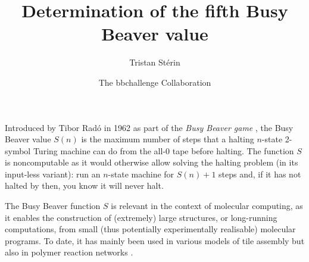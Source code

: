 \documentclass[11pt]{article}
\title{
  \vspace{-1em}  
Determination of the fifth Busy Beaver value\vspace{-0.5em}}
\author[1]{Tristan Stérin}
\author[2]{The bbchallenge Collaboration}
\affil[1]{prgm.dev, Paris, France\\ \href{mailto:tristan@prgm.dev}{tristan@prgm.dev}}
\affil[2]{bbchallenge.org\\ \href{mailto:bbchallenge@bbchallenge.org}{bbchallenge@bbchallenge.org}}
\date{}
\newcommand{\radofull}{Tibor Rad\'o\xspace}
\theoremstyle{definition} %
\numberwithin{equation}{section}
\theoremstyle{definition} %
\begin{document}
\maketitle

\newcommand{\ie}{i.e.\ }
\newcommand{\eg}{e.g.\ }

\newcommand{\noncomput}{noncomputable\xspace}
\newcommand{\BBfull}{Busy Beaver\xspace}
\newcommand{\Coq}{Coq\xspace}
\newcommand{\CoqProofReleaseURL}{\url{https://github.com/ccz181078/Coq-BB5}}

\vspace{-3em}

Introduced by \radofull in 1962 as part of the \textit{Busy Beaver game} \cite{Rado_1962}, the Busy Beaver value $S(n)$ is the maximum number of steps that a halting $n$-state 2-symbol Turing machine can do from the all-0 tape before halting. The function $S$ is noncomputable as it would otherwise allow solving the halting problem (in its input-less variant): run an $n$-state machine for $S(n)+1$ steps and, if it has not halted by then, you know it will never halt.

The Busy Beaver function $S$ is relevant in the context of molecular computing, as it enables the construction of (extremely) large structures, or long-running computations, from small (thus potentially experimentally realisable) molecular programs. To date, it has mainly been used in various models of tile assembly \cite{10.1145/335305.335358, Caballero2024, CANNON202150} but also in polymer reaction networks \cite{JOHNSON202084}.
\end{document}
